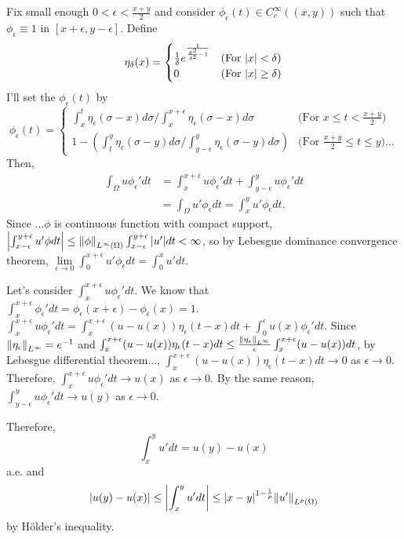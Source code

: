 \documentclass{article}
\begin{document}
Fix small enough $0<\epsilon<\frac{x+y}{2}$ and consider $\phi_\epsilon(t)\in C_c^\infty((x, y))$ such that $\phi_\epsilon\equiv 1$ in $[x+\epsilon, y-\epsilon]$. Define 
\begin{equation*}
\eta_\delta(x)=
\begin{cases}
\frac{1}{\delta}e^{\frac{1}{\frac{x^2}{\delta^2}-1}} & \text{(For }\abs{x}<\delta\text{)} \\
0 & \text{(For }\abs{x}\geq\delta\text{)}
\end{cases}
\end{equation*}
I'll set the $\phi_\epsilon(t)$ by
\begin{equation*}
\phi_\epsilon(t)=
\begin{cases}
\int_x^t \eta_\epsilon(\sigma-x)d\sigma/\int_x^{x+\epsilon} \eta_\epsilon(\sigma-x)d\sigma & \text{(For }x\leq t<\frac{x+y}{2}\text{)} \\
1-\left(\int_t^y \eta_\epsilon(\sigma-y)d\sigma/\int_{y-\epsilon}^y \eta_\epsilon(\sigma-y)d\sigma\right) & \text{(For }\frac{x+y}{2}\leq t\leq y\text{)}...
\end{cases}
\end{equation*}
Then,
\begin{equation*}
\begin{split}
\int_\Omega u\phi_\epsilon'dt&=\int_{x}^{x+\epsilon} u \phi_\epsilon' dt + \int_{y-\epsilon}^{y} u \phi_\epsilon' dt \\
&=\int_\Omega u'\phi_\epsilon dt=\int_{x}^{y} u'\phi_\epsilon dt.
\end{split}
\end{equation*}
Since ...$\phi$ is continuous function with compact support, $\abs{\int_{x-\epsilon}^{y+\epsilon} u'\phi dt} \leq \norm{\phi}_{L^\infty(\Omega)}\int_{x-\epsilon}^{y+\epsilon} \abs{u'} dt< \infty$, so by Lebesgue dominance convergence theorem, $\lim\limits_{\epsilon\rightarrow 0} \int_0^{x+\epsilon} u'\phi_\epsilon dt=\int_0^x u' dt$.

Let's consider $\int_x^{x+\epsilon} u\phi_\epsilon' dt$. We know that $\int_x^{x+\epsilon} \phi_\epsilon' dt=\phi_\epsilon(x+\epsilon)-\phi_\epsilon(x)=1$. $\int_x^{x+\epsilon} u\phi_\epsilon' dt=\int_x^{x+\epsilon} (u - u(x)) \eta_\epsilon(t-x) dt + \int_0^\epsilon u(x)\phi_\epsilon' dt$. Since $\norm{\eta_\epsilon}_{L^\infty}=e^{-1}$ and $\int_x^{x+\epsilon} (u - u(x)) \eta_\epsilon(t-x) dt \leq \frac{\norm{\eta_\epsilon}_{L^\infty}}{\epsilon}\int_x^{x+\epsilon} (u - u(x)) dt$, by Lebesgue differential theorem..., $\int_x^{x+\epsilon} (u - u(x)) \eta_\epsilon(t-x) dt\rightarrow 0$ as $\epsilon\rightarrow 0$. 
Therefore, $\int_x^{x+\epsilon} u\phi_\epsilon' dt \rightarrow u(x)$ as $\epsilon\rightarrow 0$. 
By the same reason, $\int_{y-\epsilon}^y u\phi_\epsilon' dt \rightarrow u(y)$ as $\epsilon\rightarrow 0$.

Therefore,
\begin{equation*}
\int_x^y u' dt = u(y) - u(x)
\end{equation*}
a.e. and
\begin{equation*}
\abs{u(y)-u(x)}\leq \abs{\int_x^y u' dt} \leq \abs{x-y}^{1-\frac{1}{p}}\norm{u'}_{L^p(\Omega)}
\end{equation*}
by H\"older's inequality.
\end{document}
